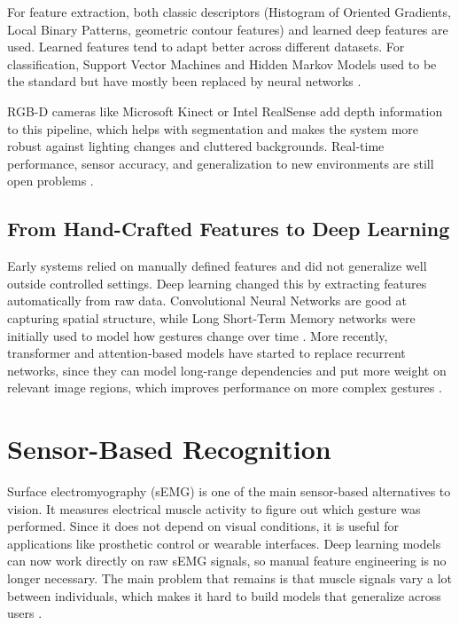 For feature extraction, both classic descriptors (Histogram of Oriented Gradients, Local Binary Patterns, geometric contour features) and learned deep features are used. Learned features tend to adapt better across different datasets. For classification, Support Vector Machines and Hidden Markov Models used to be the standard but have mostly been replaced by neural networks \cite{qiComputerVisionbasedHand2024}.
 
RGB-D cameras like Microsoft Kinect or Intel RealSense add depth information to this pipeline, which helps with segmentation and makes the system more robust against lighting changes and cluttered backgrounds. Real-time performance, sensor accuracy, and generalization to new environments are still open problems \cite{qiComputerVisionbasedHand2024}.
 
\subsection{From Hand-Crafted Features to Deep Learning}
Early systems relied on manually defined features and did not generalize well outside controlled settings. Deep learning changed this by extracting features automatically from raw data. Convolutional Neural Networks are good at capturing spatial structure, while Long Short-Term Memory networks were initially used to model how gestures change over time \cite{cuiDeepVisionbasedRealtime2025}. More recently, transformer and attention-based models have started to replace recurrent networks, since they can model long-range dependencies and put more weight on relevant image regions, which improves performance on more complex gestures \cite{shinMethodologicalStructuralReview2024}.
 
\section{Sensor-Based Recognition}
Surface electromyography (sEMG) is one of the main sensor-based alternatives to vision. It measures electrical muscle activity to figure out which gesture was performed. Since it does not depend on visual conditions, it is useful for applications like prosthetic control or wearable interfaces. Deep learning models can now work directly on raw sEMG signals, so manual feature engineering is no longer necessary. The main problem that remains is that muscle signals vary a lot between individuals, which makes it hard to build models that generalize across users \cite{zanghieriSEMGbasedHandGesture2023}.
 
